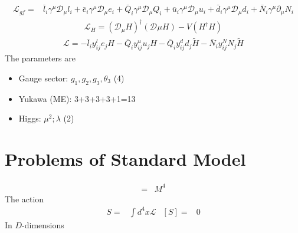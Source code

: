 \documentclass[12pt,letterpaper]{article}
\begin{document}
\begin{align*}
  \mathcal{L}_{gf}=&\bar{l}_i \gamma^{\mu}\mathcal{D}_{\mu}l_i
+\bar{e}_i \gamma^{\mu}\mathcal{D}_{\mu}e_i
+\bar{Q}_i \gamma^{\mu}\mathcal{D}_{\mu}Q_i
+\bar{u}_i \gamma^{\mu}\mathcal{D}_{\mu}u_i
+\bar{d}_i \gamma^{\mu}\mathcal{D}_{\mu}d_i
+\bar{N}_i \gamma^{\mu}\partial_{\mu}N_i
\end{align*}
\begin{align*}
  \mathcal{L}_{H}=\left( \mathcal{D}_{\mu}H \right)^{\dagger}
\left( \mathcal{D}^{}{\mu}H \right)-V(H^{\dagger}H)
\end{align*}
\begin{align*}
  \mathcal{L}=-\bar{l}_i y^l_{ij}e_j H
-\bar{Q}_i y^u_{ij}u_j H
-\bar{Q}_i y^d_{ij}d_j \tilde{H}
-\bar{N}_i y^N_{ij}N_j \tilde{H}
\end{align*}
The parameters are
\begin{itemize}
\item Gauge sector: $g_1,g_2,g_3,\theta_3$ (4)
\item Yukawa (ME): 3+3+3+3+1=13
\item Higgs: $\mu^2;\lambda$ (2)
\end{itemize}

\section{Problems of Standard Model}

\begin{align*}
  [\mathcal{L}]=&M^4
\end{align*}
The action
\begin{align*}
  S=&\int d^4x \mathcal{L} & [S]=&0
\end{align*}
In $D$-dimensions
\end{document}
